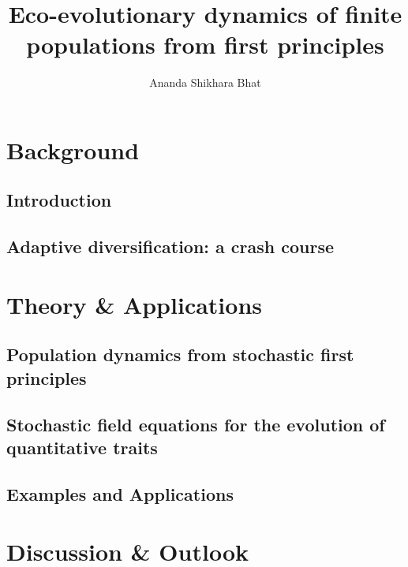 \documentclass[twoside, 12pt]{iiser-thesis}
\title{Eco-evolutionary dynamics of finite populations from first principles}
\author{Ananda Shikhara Bhat}
\begin{document}
\pagestyle{plain}
\thesisfront
\listoftables
{}
\listoffigures
{}

\part{Background}


\pagestyle{fancy}
\fancyhf{}
\fancyhead[LE,RO]{\thepage}
\fancyhead[RE]{\rule[-2ex]{0pt}{4ex}\footnotesize\itshape\nouppercase{\leftmark}}
\fancyhead[LO]{\rule[-2ex]{0pt}{4ex}\footnotesize\itshape\nouppercase{\rightmark}}
\setlength{\headheight}{18pt} %
\renewcommand{\headrulewidth}{0pt}

\renewcommand{\chaptermark}[1]{\markboth{\chaptername \ \thechapter \ :\ #1}{}}
\renewcommand{\sectionmark}[1]{\markright{\thesection. \ \ #1}{}}

\chapter{Introduction}

\chapter{Adaptive diversification: a crash course}\label{chap_AD}


\part{Theory \& Applications}
\chapter{Population dynamics from stochastic first principles}\label{chap_BD}

\chapter{Stochastic field equations for the evolution of quantitative traits}\label{chap_infD_processes}

\chapter{Examples and Applications}\label{chap_examples}


\part{Discussion \& Outlook}
\end{document}
